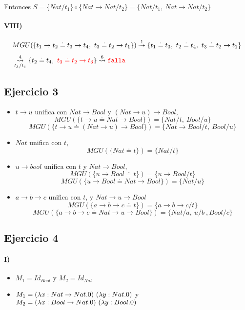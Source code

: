 \documentclass[10pt,a4paper]{article}
\begin{document}
Entonces $S = \{Nat/t_1\} \circ \{Nat\to Nat/t_2\} = \{Nat/t_1,~Nat\to Nat/t_2\}$

\paragraph{VIII)}
\begin{align*}
&MGU(\{t_1\to t_2\doteq t_3\to t_4, ~t_3\doteq t_2\to t_1\}) \goesTo{1}{} \{t_1\doteq t_3,~ t_2\doteq t_4, ~t_3\doteq t_2\to t_1\} \\
&\goesTo{4}{t_3/t_1} \{t_2\doteq t_4, ~\red{t_3\doteq t_2\to t_3}\} \goesTo{6}{} \falla\\
\end{align*}

\subsection{Ejercicio 3}

\begin{itemize}
\item $t\to u$ unifica con $Nat\to Bool$ y $(Nat\to u)\to Bool$,
    $$MGU(\{t\to u \doteq Nat\to Bool\}) = \{Nat/t,~Bool/u\}$$
    $$MGU(\{t\to u \doteq (Nat\to u)\to Bool\}) = \{Nat\to Bool/t,~Bool/u\}$$
\item $Nat$ unifica con $t$,
    $$MGU(\{Nat \doteq t\}) = \{Nat/t\}$$
\item $u\to bool$ unifica con $t$ y $Nat\to Bool$, 
    $$MGU(\{u\to Bool \doteq t\}) = \{u\to Bool/t\}$$
    $$MGU(\{u\to Bool \doteq Nat\to Bool\}) = \{Nat/u\}$$
\item $a\to b \to c$ unifica con $t$, y $Nat\to u \to Bool$
    $$MGU(\{a\to b \to c \doteq t\}) = \{a\to b \to c/t\}$$
        $$MGU(\{a\to b \to c \doteq Nat\to u \to Bool\}) = \{Nat/a,~u/b~, Bool/c\}$$
\end{itemize}

\subsection{Ejercicio 4}
\paragraph{I)}
\begin{itemize}
    \item $M_1 = Id_{Bool}$ y $M_2 = Id_{Nat}$
    \item $M_1 = (\lambdaAbs{x}{Nat\to Nat}{0})~(\lambdaAbs{y}{Nat}{0})$ y $M_2 = (\lambdaAbs{x}{Bool\to Nat}{0})~(\lambdaAbs{y}{Bool}{0})$
\end{itemize}
\end{document}
